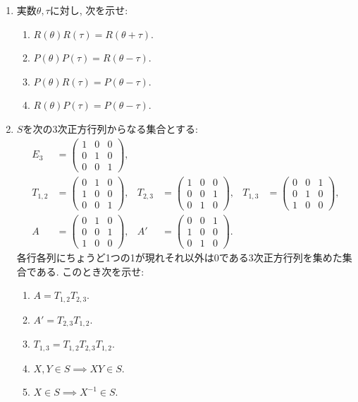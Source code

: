 \begin{enumerate}
\item
  実数$\theta, \tau$に対し, 次を示せ:
  \begin{enumerate}
  \item
    $R(\theta) R(\tau)=R(\theta+\tau)$.
  \item
    $P(\theta) P(\tau)=R(\theta-\tau)$.
  \item
    $P(\theta) R(\tau)=P(\theta-\tau)$.
  \item
    $R(\theta) P(\tau)=P(\theta-\tau)$.
  \end{enumerate}
\item
  $S$を次の$3$次正方行列からなる集合とする:
  \begin{align*}
    E_3&=\begin{pmatrix}1&0&0\\0&1&0\\0&0&1\end{pmatrix},\\
    T_{1,2}&=\begin{pmatrix}0&1&0\\1&0&0\\0&0&1\end{pmatrix},&
    T_{2,3}&=\begin{pmatrix}1&0&0\\0&0&1\\0&1&0\end{pmatrix},&
    T_{1,3}&=\begin{pmatrix}0&0&1\\0&1&0\\1&0&0\end{pmatrix},\\
    A&=\begin{pmatrix}0&1&0\\0&0&1\\1&0&0\end{pmatrix},&
    A'&=\begin{pmatrix}0&0&1\\1&0&0\\0&1&0\end{pmatrix}.
  \end{align*}
  各行各列にちょうど1つの1が現れそれ以外は0である$3$次正方行列を集めた集合である.
  このとき次を示せ:
  \begin{enumerate}
    \item $A=T_{1,2}T_{2,3}$.
    \item $A'=T_{2,3}T_{1,2}$.
    \item $T_{1,3}=T_{1,2}T_{2,3}T_{1,2}$.
    \item $X, Y\in S \implies XY\in S$.
    \item $X\in S \implies X^{-1}\in S$.
  \end{enumerate}
\end{enumerate}

